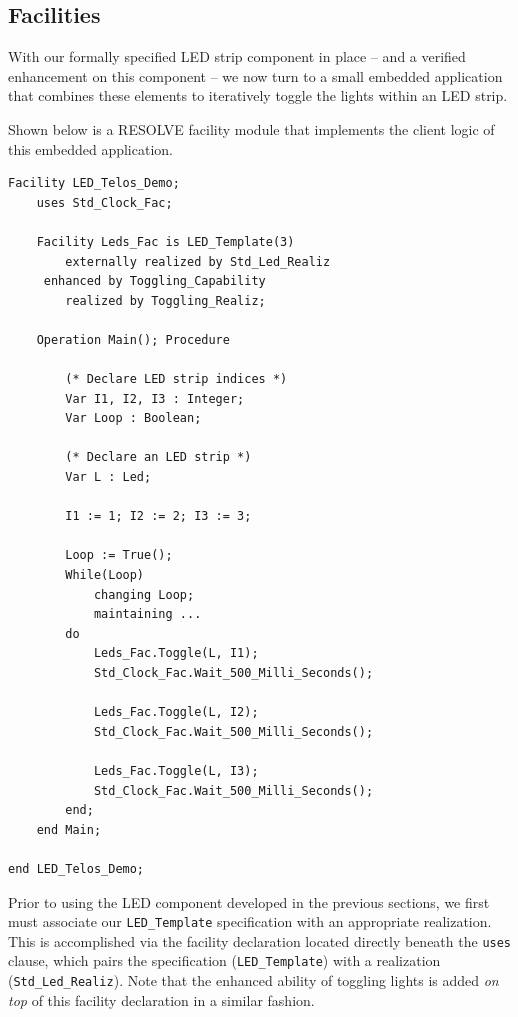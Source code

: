 \documentclass{sig-alternate}
\begin{document}
\subsection{Facilities}
\label{sec:facilities}

With our formally specified LED strip component in place -- and a verified enhancement on this component -- we now turn to a small embedded application that combines these elements to iteratively toggle the lights within an LED strip.

Shown below is a RESOLVE facility module that implements the client logic of this embedded application.
\begin{verbatim}
Facility LED_Telos_Demo;
    uses Std_Clock_Fac;
    
    Facility Leds_Fac is LED_Template(3)
        externally realized by Std_Led_Realiz
     enhanced by Toggling_Capability
        realized by Toggling_Realiz;
        
    Operation Main(); Procedure
    
        (* Declare LED strip indices *)
        Var I1, I2, I3 : Integer;
        Var Loop : Boolean;
        
        (* Declare an LED strip *)
        Var L : Led;
        
        I1 := 1; I2 := 2; I3 := 3;
        
        Loop := True();
        While(Loop)
            changing Loop;
            maintaining ...
        do
            Leds_Fac.Toggle(L, I1);
            Std_Clock_Fac.Wait_500_Milli_Seconds();
            
            Leds_Fac.Toggle(L, I2);
            Std_Clock_Fac.Wait_500_Milli_Seconds();
            
            Leds_Fac.Toggle(L, I3);
            Std_Clock_Fac.Wait_500_Milli_Seconds();
        end;
    end Main;
    
end LED_Telos_Demo;
\end{verbatim}
Prior to using the LED component developed in the previous sections, we first must associate our \texttt{LED\_Template} specification with an appropriate realization. This is accomplished via the facility declaration located directly beneath the \texttt{uses} clause, which pairs the specification (\texttt{LED\_Template}) with a realization (\texttt{Std\_Led\_Realiz}). Note that the enhanced ability of toggling lights is added \textit{on top} of this facility declaration in a similar fashion.
\end{document}

